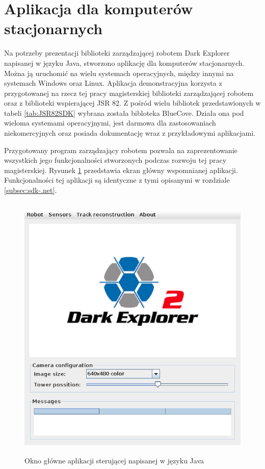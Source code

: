 \section{Aplikacja dla komputerów stacjonarnych}
\label{sec:java-app}
Na potrzeby prezentacji biblioteki zarządzającej robotem Dark Explorer napisanej
w języku Java, stworzono aplikację dla komputerów stacjonarnych. Można ją
uruchomić na wielu systemach operacyjnych, między innymi na systemach Windows
oraz Linux. Aplikacja demonstracyjna korzysta z przygotowanej na rzecz tej pracy
magisterskiej biblioteki zarządzającej robotem oraz z biblioteki wspierającej JSR
82. Z pośród wielu bibliotek przedstawionych w tabeli \ref{tab:JSR82SDK} wybrana
została bibloteka BlueCove\cite{website:bluecove.org}. Działa ona pod wieloma
systemami operacyjnymi, jest darmowa dla zastosowaniach niekomercyjnych oraz
posiada dokumentację wraz z przykładowymi aplikacjami.

Przygotowany program zarządzający robotem pozwala na zaprezentowanie wszystkich
jego funkcjonalności stworzonych podczas rozwoju tej pracy magisterskiej. Rysunek
\ref{fig:java-desk-app} przedstawia ekran główny wspomnianej aplikacji. Funkcjonalności tej aplikacji są identyczne z tymi opisanymi w rozdziale \ref{subsec:sdk-.net}.

\begin{figure}[!ht]
 \centering
 \includegraphics[height=130mm]{../images/ch03/java-desk-app.png}
 \caption{Okno główne aplikacji sterującej napisanej w języku Java}
 \label{fig:java-desk-app}
\end{figure}